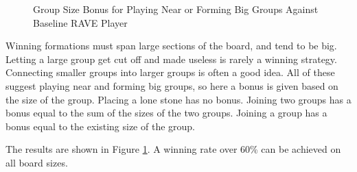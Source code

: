 \begin{figure}
	\centering
{}
	\caption[Group Size Bonus]{Group Size Bonus for Playing Near or Forming Big Groups Against Baseline RAVE Player}
	\label{fig:groupsize}
\end{figure}

Winning formations must span large sections of the board, and tend to be big. Letting a large group get cut off and made useless is rarely a winning strategy. Connecting smaller groups into larger groups is often a good idea. All of these suggest playing near and forming big groups, so here a bonus is given based on the size of the group. Placing a lone stone has no bonus. Joining two groups has a bonus equal to the sum of the sizes of the two groups. Joining a group has a bonus equal to the existing size of the group.

The results are shown in Figure \ref{fig:groupsize}. A winning rate over 60\% can be achieved on all board sizes.




